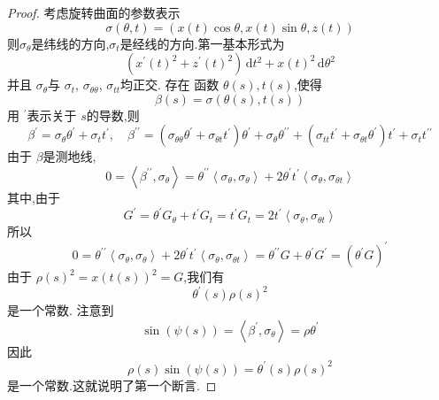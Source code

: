 \documentclass[../../main.tex]{subfiles}
\begin{document}
\begin{proof}
    考虑旋转曲面的参数表示 \[
     \sigma \left(  \theta ,t \right)= \left( x\left( t \right)\cos  \theta ,x\left( t \right)\sin  \theta ,z\left( t \right)    \right)  
    \]则\(   \sigma _{ \theta }  \)是纬线的方向,\(   \sigma _{t}  \)是经线的方向.第一基本形式为 \[
    \left(x^{\prime} \left( t \right)^{2}+ z^{\prime} \left( t \right)^{2}  \right)\,\mathrm{d} t^{2}+ x\left( t \right)^{2}\,\mathrm{d}  \theta ^{2}  
    \]并且 \(   \sigma _{ \theta }  \)与 \(   \sigma _{t}  \), \(   \sigma _{ \theta  \theta }  \), \(   \sigma _{ t t}  \)均正交.      存在 函数 \(   \theta \left( s \right),t\left( s \right)    \),使得 \[
    \beta \left( s \right)=  \sigma \left(  \theta \left( s \right),t\left( s \right)   \right)  
    \] 用 \(  ^{\prime}   \)表示关于 \(  s  \)的导数,则 \[
    \beta ^{\prime} =  \sigma _{ \theta } \theta ^{\prime} +  \sigma _{t}t^{\prime} ,\quad \beta ^{\prime \prime} =  \left(  \sigma _{ \theta  \theta } \theta ^{\prime} +  \sigma _{ \theta t}t^{\prime}  \right) \theta ^{\prime} +  \sigma _{ \theta } \theta ^{\prime \prime} + \left(  \sigma _{tt}t^{\prime} +  \sigma _{ \theta t} \theta ^{\prime}  \right)t^{\prime} +  \sigma _{t}t^{\prime \prime}   
    \]  由于 \(  \beta   \)是测地线, \[
    0= \left<\beta ^{\prime \prime} , \sigma _{ \theta } \right>=  \theta ^{\prime \prime} \left< \sigma _{ \theta }, \sigma _{ \theta } \right>+ 2 \theta ^{\prime} t^{\prime} \left< \sigma _{ \theta }, \sigma _{ \theta t} \right>
    \] 其中,由于 \[
    G^{\prime} =  \theta ^{\prime} G_{ \theta }+ t^{\prime} G_{t}= t^{\prime} G_{t}= 2t^{\prime} \left< \sigma _{ \theta }, \sigma _{ \theta t} \right>
    \]所以 \[
    0=  \theta ^{\prime \prime} \left< \sigma _{ \theta }, \sigma _{ \theta } \right>+ 2 \theta ^{\prime} t^{\prime} \left< \sigma _{ \theta }, \sigma _{ \theta t} \right>=  \theta ^{\prime \prime} G+  \theta ^{\prime} G^{\prime} = \left(  \theta ^{\prime} G \right)^{\prime}  
    \]由于 \(  \rho \left( s \right)^{2}= x\left( t\left( s \right)  \right) ^{2}= G   \),我们有 \[
     \theta ^{\prime} \left( s \right)\rho \left( s \right)  ^{2}
    \]是一个常数. 注意到 \[
    \sin \left( \psi \left( s \right)  \right)= \left<\beta ^{\prime} , \sigma _{ \theta } \right>= \rho  \theta ^{\prime}  
    \]因此 \[
    \rho \left( s \right)\sin \left( \psi \left( s \right)  \right)=  \theta ^{\prime} \left( s \right)\rho \left( s \right)^{2}    
    \]是一个常数.这就说明了第一个断言.


\end{proof}
\end{document}
